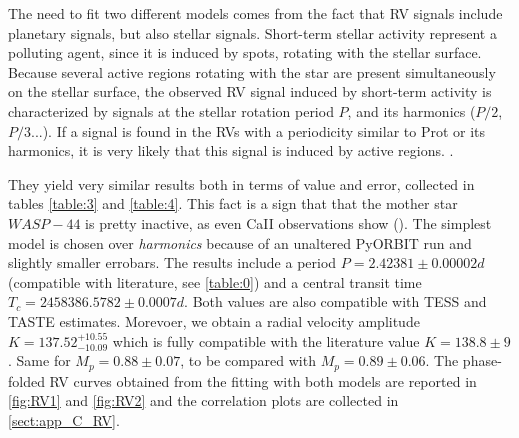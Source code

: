 \documentclass[a4paper,11pt,twocolumn]{article}
\begin{document}
The need to fit two different models comes from the fact that RV signals include planetary signals, 
but also stellar signals. Short-term stellar activity represent a polluting agent, since it is 
induced by spots, rotating with the stellar surface. Because several active regions rotating 
with the star are present simultaneously on the stellar surface, the observed RV signal 
induced by short-term activity is characterized by signals at the stellar rotation period 
$P$, and its harmonics ($P/2$, $P/3$...). If a signal is found in the RVs with a periodicity 
similar to Prot or its harmonics, it is very likely that this signal is induced by active regions. . 


They yield very similar results both in terms of value and error, collected 
in tables \ref{table:3} and \ref{table:4}. This fact is a sign that that 
the mother star $WASP-44$ is pretty inactive, as even CaII observations 
show (\cite{Turner}). The simplest model is chosen over \textit{harmonics}
because of an unaltered PyORBIT run and slightly smaller errobars. 
The results include a period $P=2.42381\pm0.00002d$ 
(compatible with literature, see \ref{table:0}) and a central 
transit time $T_c=2458386.5782\pm0.0007d$. Both values are also 
compatible with TESS and TASTE estimates.
Morevoer, we obtain a radial velocity amplitude $K=137.52^{+10.55}_{-10.09}$
which is fully compatible with the literature value $K=138.8\pm9$. Same for 
$M_p = 0.88\pm0.07$, to be compared with $M_p = 0.89 \pm 0.06$.
The phase-folded RV curves obtained from the fitting with both models 
are reported in \ref{fig:RV1} and \ref{fig:RV2} and the correlation plots 
are collected in \ref{sect:app_C_RV}. 


\begin{table}[H]
    \centering
     \caption{Physical parameters obtained from \textit{radial velocities} model.}
\label{table:3}
\end{table}
\end{document}
